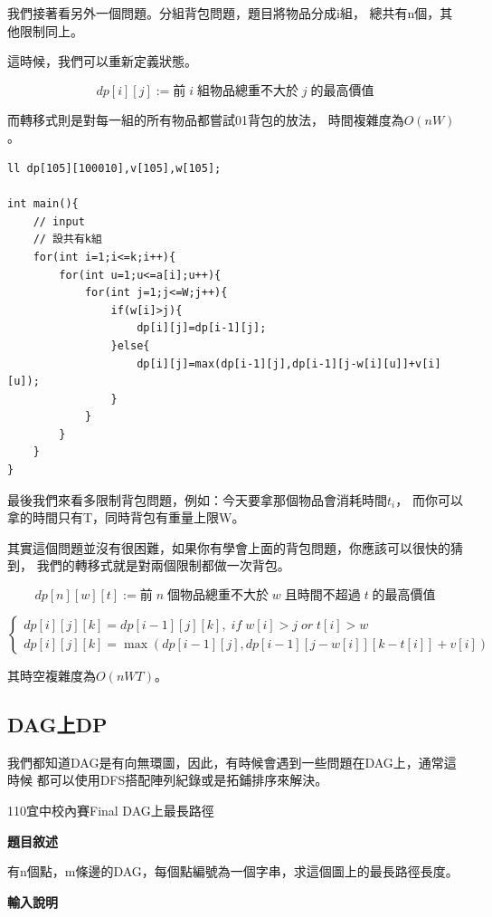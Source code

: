     我們接著看另外一個問題。分組背包問題，題目將物品分成i組，
    總共有n個，其他限制同上。

    這時候，我們可以重新定義狀態。

    $$dp[i][j] := 前 \; i \; 組物品總重不大於 \; j \; 的最高價值$$

    而轉移式則是對每一組的所有物品都嘗試01背包的放法，
    時間複雜度為$O(nW)$。

\begin{lstlisting}[caption=分組背包]
ll dp[105][100010],v[105],w[105];

int main(){
    // input
    // 設共有k組
    for(int i=1;i<=k;i++){
        for(int u=1;u<=a[i];u++){
            for(int j=1;j<=W;j++){
                if(w[i]>j){
                    dp[i][j]=dp[i-1][j];
                }else{
                    dp[i][j]=max(dp[i-1][j],dp[i-1][j-w[i][u]]+v[i][u]);
                }
            }
        }
    }
}
\end{lstlisting}

    最後我們來看多限制背包問題，例如：今天要拿那個物品會消耗時間$t_i$，
    而你可以拿的時間只有T，同時背包有重量上限W。

    其實這個問題並沒有很困難，如果你有學會上面的背包問題，你應該可以很快的猜到，
    我們的轉移式就是對兩個限制都做一次背包。

    $$dp[n][w][t] := 前 \; n \; 個物品總重不大於 \; w \; 且時間不超過 \; t \; 的最高價值$$

    $$
    \begin{cases}
        dp[i][j][k]=dp[i-1][j][k], \; if \; w[i]>j \; or \; t[i]>w \\
        dp[i][j][k]=\max(dp[i-1][j],dp[i-1][j-w[i]][k-t[i]]+v[i])
    \end{cases}
    $$

    其時空複雜度為$O(nWT)$。

    \subsection{DAG上DP}

    我們都知道DAG是有向無環圖，因此，有時候會遇到一些問題在DAG上，通常這時候
    都可以使用DFS搭配陣列紀錄或是拓鋪排序來解決。

    \example 110宜中校內賽Final DAG上最長路徑

    \textbf{題目敘述}

    有n個點，m條邊的DAG，每個點編號為一個字串，求這個圖上的最長路徑長度。

    \textbf{輸入說明}

